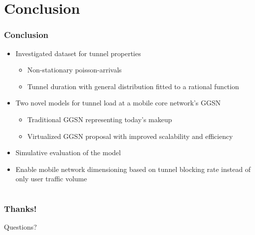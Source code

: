 \documentclass{beamer}
\begin{document}
\section{Conclusion}

\begin{frame}
	\frametitle{Conclusion}

	\begin{itemize}
		\item Investigated dataset for tunnel properties

		\begin{itemize}
			\item Non-stationary poisson-arrivals
			\item Tunnel duration with general distribution fitted to a rational function
		\end{itemize}

		\item Two novel models for tunnel load at a mobile core network's GGSN
		\begin{itemize}
			\item Traditional GGSN representing today's makeup
			\item Virtualized GGSN proposal with improved scalability and efficiency
		\end{itemize}

		\item Simulative evaluation of the model

		\item Enable mobile network dimensioning based on tunnel blocking rate instead of only user traffic volume


	\end{itemize}

\end{frame}

\section*{}

\begin{frame}
	\frametitle{Thanks!}

	\centering
		\Large Questions?
\end{frame}


\begin{frame}
\end{frame}
\end{document}
